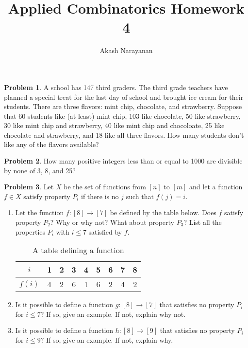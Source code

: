 \documentclass[12pt]{article}
\title{Applied Combinatorics Homework 4}
\author{Akash Narayanan}
\newcounter{chapternumber}
\theoremstyle{definition}
\newtheorem{problem-internal}{Problem}[chapternumber]
\newenvironment{problem}{
  \medskip
  \begin{problem-internal}
}{
\end{problem-internal}
}
\begin{document}
  \maketitle

  \setcounter{chapternumber}{7}
  \begin{problem}
    A school has 147 third graders. The third grade teachers have planned a special treat for the last day of school and brought ice cream for their students.
    There are three flavors: mint chip, chocolate, and strawberry.
    Suppose that 60 students like (at least) mint chip, 103 like chocolate, 50 like strawberry, 30 like mint chip and strawberry, 40 like mint chip and chocoloate, 25 like chocolate and strawberry, and 18 like all three flavors.
    How many students don't like any of the flavors available?
  \end{problem}


  \setcounter{problem-internal}{4}
  \begin{problem}
    How many positive integers less than or equal to 1000 are divisible by none of 3, 8, and 25?
  \end{problem}


  \setcounter{problem-internal}{10}
  \begin{problem}
    Let \(X\) be the set of functions from \([n]\) to \([m]\) and let a function \(f \in X\) satisfy property \(P_{i}\) if there is no \(j\) such that \(f(j) = i\).
    \begin{enumerate}[label={\alph*.}]
      \item Let the function \(f:[8] \rightarrow [7]\) be defined by the table below.
      Does \(f\) satisfy property \(P_{2}\)? Why or why not?
      What about property \(P_{3}\)? List all the properties \(P_{i}\) with \(i \leq 7\) satisfied by \(f\).

      \begin{table}[H]
        \centering
        \begin{tabular}{c c c c c c c c c}
          \(i\) & 1 & 2 & 3 & 4 & 5 & 6 & 7 & 8 \\
          \hline
          \(f(i)\) & 4 & 2 & 6 & 1 & 6 & 2 & 4 & 2
        \end{tabular}
        \caption{A table defining a function}
      \end{table}

      \item Is it possible to define a function \(g:[8] \rightarrow [7]\) that satisfies no property \(P_{i}\) for \(i \leq 7\)?
      If so, give an example. If not, explain why not.

      \item Is it possible to define a function \(h:[8] \rightarrow [9]\) that satisfies no property \(P_{i}\) for \(i \leq 9\)? If so, give an example. If not, explain why.
    \end{enumerate}
  \end{problem}
\end{document}
